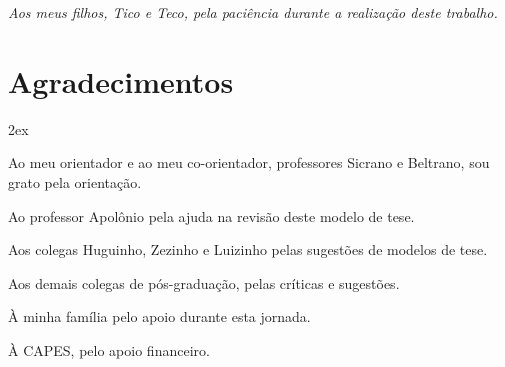 %
%


\begin{titlepage}

\vspace*{\fill}

\hfill
\begin{minipage}{0.5\linewidth}
\begin{flushright}
\large\it
Aos meus filhos, Tico e Teco, pela paciência durante
a realização deste trabalho.
\end{flushright}
\end{minipage}

\vspace*{\fill}

\end{titlepage}

%
%


\chapter*{Agradecimentos}
\thispagestyle{empty}

\begin{trivlist}  \itemsep 2ex

\item Ao meu orientador e ao meu co-orientador, professores Sicrano
e Beltrano, sou grato pela orientação.

\item Ao professor Apolônio pela ajuda na revisão deste
modelo de tese.

\item Aos colegas Huguinho, Zezinho e Luizinho pelas sugestões de
modelos de tese.

\item Aos demais colegas de pós-graduação, pelas críticas e sugestões.

\item À minha família pelo apoio durante esta jornada.

\item À CAPES, pelo apoio financeiro.

\end{trivlist}
